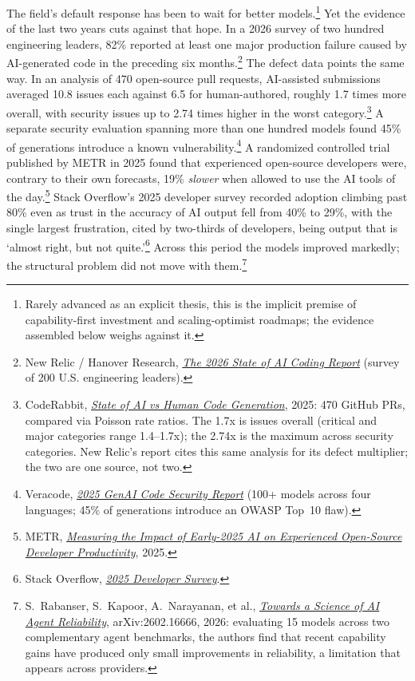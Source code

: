\documentclass[11pt, a4paper]{article}
\begin{document}
The field's default response has been to wait for better models.\footnote{Rarely
advanced as an explicit thesis, this is the implicit premise of capability-first investment
and scaling-optimist roadmaps; the evidence assembled below weighs against it.} Yet the evidence of
the last two years cuts against that hope. In a 2026 survey of two hundred engineering
leaders, 82\% reported at least one major production failure caused by AI-generated code
in the preceding six
months.\footnote{New Relic / Hanover Research, \href{https://newrelic.com/blog/ai/state-of-ai-coding-2026}{\textit{The 2026 State of AI Coding Report}} (survey of 200 U.S. engineering leaders).}
The defect data points the same way. In an analysis of 470 open-source pull requests,
AI-assisted submissions averaged 10.8 issues each against 6.5 for human-authored,
roughly 1.7 times more overall, with security issues up to 2.74 times higher in the
worst category.\footnote{CodeRabbit, \href{https://coderabbit.ai/blog/state-of-ai-vs-human-code-generation-report}{\textit{State of AI vs Human Code Generation}}, 2025: 470 GitHub PRs, compared via Poisson rate ratios. The 1.7x is issues overall (critical and major categories range 1.4--1.7x); the 2.74x is the maximum across security categories. New Relic's report cites this same analysis for its defect multiplier; the two are one source, not two.}
A separate security evaluation spanning more than one hundred models found 45\% of
generations introduce a known
vulnerability.\footnote{Veracode, \href{https://www.veracode.com/wp-content/uploads/2025_GenAI_Code_Security_Report_Final.pdf}{\textit{2025 GenAI Code Security Report}} (100+ models across four languages; 45\% of generations introduce an OWASP Top~10 flaw).}
A randomized controlled trial published by METR in 2025 found that experienced
open-source developers were, contrary to their own forecasts, 19\% \emph{slower} when
allowed to use the AI tools of the
day.\footnote{METR, \href{https://metr.org/blog/2025-07-10-early-2025-ai-experienced-os-dev-study/}{\textit{Measuring the Impact of Early-2025 AI on Experienced Open-Source Developer Productivity}}, 2025.}
Stack Overflow's 2025 developer survey recorded adoption climbing past 80\% even as trust
in the accuracy of AI output fell from 40\% to 29\%, with the single largest
frustration, cited by two-thirds of developers, being output that is `almost right,
but not quite.'\footnote{Stack Overflow, \href{https://survey.stackoverflow.co/2025/ai}{\textit{2025 Developer Survey}}.}
Across this period the models improved markedly; the structural problem did not move with
them.\footnote{S.~Rabanser, S.~Kapoor, A.~Narayanan, et al., \href{https://arxiv.org/abs/2602.16666}{\textit{Towards a Science of AI Agent Reliability}}, arXiv:2602.16666, 2026: evaluating 15 models across two complementary agent benchmarks, the authors find that recent capability gains have produced only small improvements in reliability, a limitation that appears across providers.}
\end{document}
